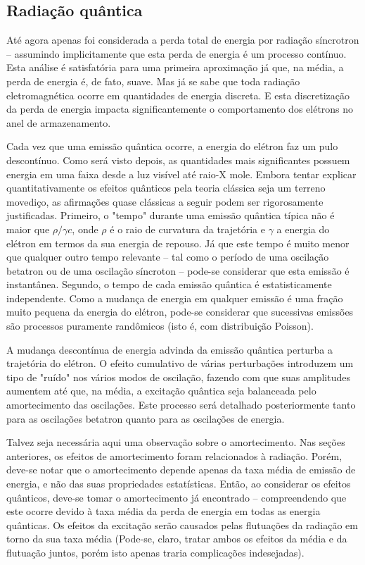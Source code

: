 \subsection{Radiação quântica}\label{sec:5.1}
Até agora apenas foi considerada a perda total de energia por radiação síncrotron -- assumindo implicitamente que esta perda de energia é um processo contínuo. Esta análise é satisfatória para uma primeira aproximação já que, na média, a perda de energia é, de fato, suave. Mas já se sabe que toda radiação eletromagnética ocorre em quantidades de energia discreta. E esta discretização da perda de energia impacta significantemente o comportamento dos elétrons no anel de armazenamento.

Cada vez que uma emissão quântica ocorre, a energia do elétron faz um pulo descontínuo. Como será visto depois, as quantidades mais significantes possuem energia em uma faixa desde a luz visível até raio-X mole. Embora tentar explicar quantitativamente os efeitos quânticos pela teoria clássica seja um terreno movediço, as afirmações quase clássicas a seguir podem ser rigorosamente justificadas. Primeiro, o "tempo" durante uma emissão quântica típica não é maior que $\rho/\gamma c$, onde $\rho$ é o raio de curvatura da trajetória e $\gamma$ a energia do elétron em termos da sua energia de repouso. Já que este tempo é muito menor que qualquer outro tempo relevante -- tal como o período de uma oscilação betatron ou de uma oscilação síncroton -- pode-se considerar que esta emissão é instantânea. Segundo, o tempo de cada emissão quântica é estatisticamente independente. Como a mudança de energia em qualquer emissão é uma fração muito pequena da energia do elétron, pode-se considerar que sucessivas emissões são processos puramente randômicos (isto é, com distribuição Poisson).

A mudança descontínua de energia advinda da emissão quântica perturba a trajetória do elétron. O efeito cumulativo de várias perturbações introduzem um tipo de "ruído" nos vários modos de oscilação, fazendo com que suas amplitudes aumentem até que, na média, a excitação quântica seja balanceada pelo amortecimento das oscilações. Este processo será detalhado posteriormente tanto para as oscilações betatron quanto para as oscilações de energia.

Talvez seja necessária aqui uma observação sobre o amortecimento. Nas seções anteriores, os efeitos de amortecimento foram relacionados à radiação. Porém, deve-se notar que o amortecimento depende apenas da taxa média de emissão de energia, e não das suas propriedades estatísticas. Então, ao considerar os efeitos quânticos, deve-se tomar o amortecimento já encontrado -- compreendendo que este ocorre devido à taxa média da perda de energia em todas as energia quânticas. Os efeitos da excitação serão causados pelas flutuações da radiação em torno da sua taxa média (Pode-se, claro, tratar ambos os efeitos da média e da flutuação juntos, porém isto apenas traria complicações indesejadas).

